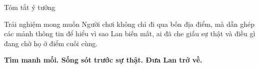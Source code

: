 \documentclass[aspectratio=169,10pt]{beamer}
\begin{document}
\begin{frame}{Tóm tắt ý tưởng}
  \begin{block}{Trải nghiệm mong muốn}
    Người chơi không chỉ đi qua bốn địa điểm, mà dần ghép các mảnh thông tin để hiểu vì sao Lan biến mất, ai đã che giấu sự thật và điều gì đang chờ họ ở điểm cuối cùng.
  \end{block}

  \vspace{0.5cm}
  \begin{center}
    \Large\textcolor{GameGreen}{\textbf{Tìm manh mối. Sống sót trước sự thật. Đưa Lan trở về.}}
  \end{center}
\end{frame}
\end{document}
